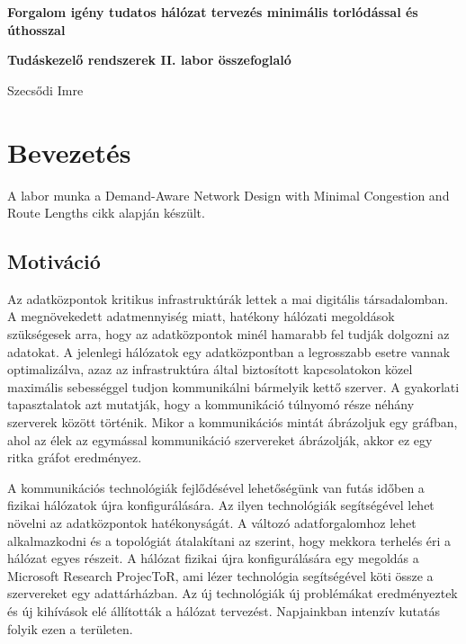 \documentclass[12pt]{report}
\begin{document}
\begin{titlepage}
	\begin{center}
		\vspace*{1cm}
		
		\textbf{\LARGE 
			Forgalom igény tudatos hálózat tervezés minimális torlódással és úthosszal
		}
	
	
		\vspace{0.5cm}
	
		\textbf{\normalsize Tudáskezelő rendszerek II. labor összefoglaló}
		
		\vfill
		
		\Large Szecsődi Imre
		
		\vspace{2.8cm}
		
		\the\year
		
	\end{center}
\end{titlepage}

\tableofcontents
	
\chapter{Bevezetés}

A labor munka a Demand-Aware Network Design with Minimal Congestion and Route Lengths \cite{avin_demand-aware_nodate} cikk alapján készült.

\section{Motiváció}

Az adatközpontok kritikus infrastruktúrák lettek a mai digitális társadalomban. 
A megnövekedett adatmennyiség miatt, hatékony hálózati megoldások szükségesek arra, hogy az adatközpontok minél hamarabb fel tudják dolgozni az adatokat. 
A jelenlegi hálózatok egy adatközpontban a legrosszabb esetre vannak optimalizálva, azaz az infrastruktúra által biztosított kapcsolatokon közel maximális sebességgel tudjon kommunikálni bármelyik kettő szerver. 
A gyakorlati tapasztalatok azt mutatják, hogy a kommunikáció túlnyomó része néhány szerverek között történik. 
Mikor a kommunikációs mintát ábrázoljuk egy gráfban, ahol az élek az egymással kommunikáció szervereket ábrázolják, akkor ez egy ritka gráfot eredményez.

A kommunikációs technológiák fejlődésével lehetőségünk van futás időben a fizikai hálózatok újra konfigurálására. 
Az ilyen technológiák segítségével lehet növelni az adatközpontok hatékonyságát. 
A változó adatforgalomhoz lehet alkalmazkodni és a topológiát átalakítani az szerint, hogy mekkora terhelés éri a hálózat egyes részeit. 
A hálózat fizikai újra konfigurálására egy megoldás a Microsoft Research ProjecToR\cite{ghobadi_projector:_2016}, ami lézer technológia segítségével köti össze a szervereket egy adattárházban. 
Az új technológiák új problémákat eredményeztek és új kihívások elé állították a hálózat tervezést.
Napjainkban intenzív kutatás folyik ezen a területen.
\end{document}
